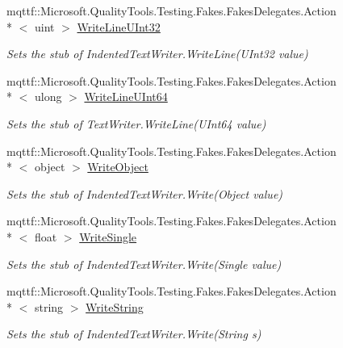 \begin{DoxyCompactItemize}
mqttf\-::\-Microsoft.\-Quality\-Tools.\-Testing.\-Fakes.\-Fakes\-Delegates.\-Action\\*
$<$ uint $>$ \hyperlink{class_system_1_1_code_dom_1_1_compiler_1_1_fakes_1_1_stub_indented_text_writer_a9c6b717450eb8311031f76f1b5f10496}{Write\-Line\-U\-Int32}
\begin{DoxyCompactList}\small\item\em Sets the stub of Indented\-Text\-Writer.\-Write\-Line(\-U\-Int32 value)\end{DoxyCompactList}\item 
mqttf\-::\-Microsoft.\-Quality\-Tools.\-Testing.\-Fakes.\-Fakes\-Delegates.\-Action\\*
$<$ ulong $>$ \hyperlink{class_system_1_1_code_dom_1_1_compiler_1_1_fakes_1_1_stub_indented_text_writer_ae40fb28c646affce0f273bd24cb970c1}{Write\-Line\-U\-Int64}
\begin{DoxyCompactList}\small\item\em Sets the stub of Text\-Writer.\-Write\-Line(\-U\-Int64 value)\end{DoxyCompactList}\item 
mqttf\-::\-Microsoft.\-Quality\-Tools.\-Testing.\-Fakes.\-Fakes\-Delegates.\-Action\\*
$<$ object $>$ \hyperlink{class_system_1_1_code_dom_1_1_compiler_1_1_fakes_1_1_stub_indented_text_writer_af2784a724912b82c2463cffa159fcc19}{Write\-Object}
\begin{DoxyCompactList}\small\item\em Sets the stub of Indented\-Text\-Writer.\-Write(\-Object value)\end{DoxyCompactList}\item 
mqttf\-::\-Microsoft.\-Quality\-Tools.\-Testing.\-Fakes.\-Fakes\-Delegates.\-Action\\*
$<$ float $>$ \hyperlink{class_system_1_1_code_dom_1_1_compiler_1_1_fakes_1_1_stub_indented_text_writer_ae51a9acb39d1763b618691c704fc5d28}{Write\-Single}
\begin{DoxyCompactList}\small\item\em Sets the stub of Indented\-Text\-Writer.\-Write(\-Single value)\end{DoxyCompactList}\item 
mqttf\-::\-Microsoft.\-Quality\-Tools.\-Testing.\-Fakes.\-Fakes\-Delegates.\-Action\\*
$<$ string $>$ \hyperlink{class_system_1_1_code_dom_1_1_compiler_1_1_fakes_1_1_stub_indented_text_writer_a0a83f3f38d95f6e5922146ade37f648e}{Write\-String}
\begin{DoxyCompactList}\small\item\em Sets the stub of Indented\-Text\-Writer.\-Write(\-String s)\end{DoxyCompactList}\item 

\end{DoxyCompactItemize}
